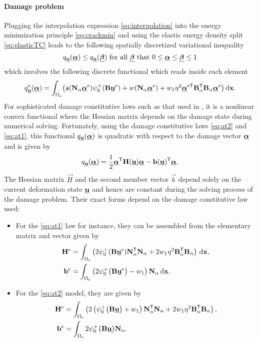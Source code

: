 \paragraph{Damage problem}
Plugging the interpolation expression \eqref{eq:interpolation} into the energy minimization principle \eqref{eq:crackmin} and using the elastic energy density split \eqref{eq:elasticTC} leads to the following spatially discretized variational inequality
\begin{equation} \label{eq:crackdis}
q_{\uvec}(\dvec)\leq q_{\uvec}(\underline{\vec{\beta}})\text{ for all $\underline{\vec{\beta}}$ that $0\leq\dvec\leq\underline{\vec{\beta}}\leq 1$}
\end{equation}
which involves the following discrete functional which reads inside each element
\begin{equation} \label{eq:qdiscrete}
q_{\uvec}^\mathrm{e}(\dvec)=\int_{\Omega_\mathrm{e}}\bigl(\mathsf{a}(\vec{N}_\alpha\dvec^\me)\psi_0^+(\vec{B}\uvec^\me)+w(\vec{N}_\alpha\dvec^\me)+w_1\eta^2\dvec^{\me\mT}\vec{B}_\alpha^\mT\vec{B}_\alpha\dvec^\me\bigr)\dx.
\end{equation}
For sophisticated damage constitutive laws such as that used in \cite{LorentzGodard:2011}, it is a nonlinear convex functional where the Hessian matrix depends on the damage state during numerical solving. Fortunately, using the damage constitutive laws \eqref{eq:at2} and \eqref{eq:at1}, this functional $q_{\uvec}(\dvec)$ is quadratic with respect to the damage vector $\dvec$ and is given by
\begin{equation} \label{eq:Hb}
q_{\uvec}(\dvec)=\frac{1}{2}\dvec^\mT\vec{H}(\uvec)\dvec-\vec{b}(\uvec)^\mT\dvec.
\end{equation}
The Hessian matrix $\vec{H}$ and the second member vector $\vec{b}$ depend solely on the current deformation state $\uvec$ and hence are constant during the solving process of the damage problem. Their exact forms depend on the damage constitutive law used:
\begin{itemize}
\item For the \eqref{eq:at1} law for instance, they can be assembled from the elementary matrix and vector given by
\begin{align*}
\vec{H}^\me &= \int_{\Omega_\me}\left(2\psi_0^+(\vec{B}\uvec^\me)\vec{N}_\alpha^\mT\vec{N}_\alpha+2w_1\eta^2 \vec{B}_\alpha^\mT\vec{B}_\alpha\right)\dx, \\
\vec{b}^\me &= \int_{\Omega_\me}\left(2\psi_0^+\bigl(\vec{B}\uvec^\me\bigr)-w_1\right)\vec{N}_\alpha\dx.
\end{align*}

\item For the \eqref{eq:at2} model, they are given by
\begin{align*}
\vec{H}^\me &= \int_{\Omega_\me}\left(2\left(\psi_0^+\bigl(\vec{B}\uvec\bigr)+w_1\right)\vec{N}_\alpha^\mT \vec{N}_\alpha+2w_1\eta^2\vec{B}_\alpha^\mT \vec{B}_\alpha\right), \\
\vec{b}^\me &= \int_{\Omega_\me}2\psi_0^+\bigl(\vec{B}\uvec\bigr)\vec{N}_\alpha.
\end{align*}
\end{itemize}
